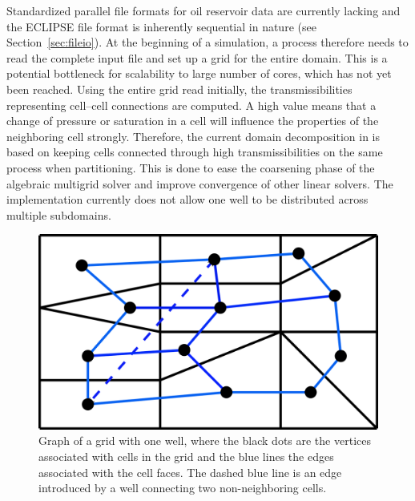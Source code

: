 Standardized parallel file formats for oil reservoir data are
currently lacking and the ECLIPSE file format is inherently sequential in
nature (see Section~\ref{sec:fileio}). 
At the beginning of a simulation, a process therefore needs
to read the complete input file and set up a grid for the entire domain. 
This is a potential bottleneck for scalability to large number of cores, which
has not yet been reached. 
Using the entire grid read initially, the transmissibilities representing cell--cell connections are
computed. A high value means that a change of pressure or
saturation in a cell will influence the properties of the neighboring
cell strongly. Therefore, the current domain decomposition in \opmflow 
is based on keeping cells connected through high transmissibilities on the same process 
when partitioning. 
This is done to ease the coarsening phase of the algebraic 
multigrid solver and improve convergence of other linear solvers. 
The implementation currently does not allow one well to be distributed across multiple 
subdomains.

\begin{figure}
\centering
\includegraphics[width=.5\linewidth]{figures/cpgrid_graph.png}
\caption{\label{fig:org3ce8b2a}
Graph of a grid with one well, where 
  the black dots are the vertices associated with cells in the grid 
  and the blue lines the edges associated with the
cell faces. The dashed blue line is an edge introduced by a well
connecting two non-neighboring cells. 
  }
\end{figure}


